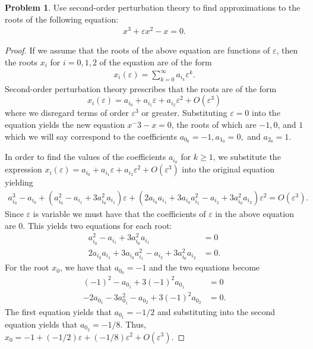 \documentclass[12pt]{article}
\theoremstyle{definition}
\newtheorem{problem}{Problem}
\begin{document}
\begin{problem}
  Use second-order perturbation theory to find approximations to the roots of the following equation:
  \begin{align*}
    x^3 + \varepsilon x^2 - x = 0.
  \end{align*}
\end{problem}

\begin{proof}
  If we assume that the roots of the above equation are functions of $\varepsilon$,
  then the roots $x_i$ for $i=0,1,2$ of the equation are of the form
  \begin{align*}
    x_i(\varepsilon) = \sum_{k=0}^\infty a_{i_k} \varepsilon ^k.
  \end{align*}
  Second-order perturbation theory prescribes that the roots are of the form
  $$x_i(\varepsilon) = a_{i_0} + a_{i_1} \varepsilon + a_{i_2} \varepsilon^2 + O(\varepsilon^3)$$
  where we disregard terms of order $\varepsilon^3$ or greater. Substituting $\varepsilon = 0$
  into the equation yields the new equation $x^-3 -x = 0$, the roots of which are $-1, 0$, and $1$
  which we will say correspond to the coefficients $a_{0_0} = -1, a_{1_0} = 0, $ and $a_{2_0} = 1$.

  In order to find the values of the coefficients $a_{i_k}$ for $k \geq 1$, we substitute the expression
  $x_i(\varepsilon) = a_{i_0} + a_{i_1} \varepsilon + a_{i_2} \varepsilon^2 + O(\varepsilon^3)$ into the original equation
  yielding
  \begin{align*}
    a_{i_0}^3-a_{i_0} + (a_{i_0}^2  -a_{i_1} + 3a_{i_0}^2a_{i_1})\varepsilon + (2a_{i_0}a_{i_1} + 3a_{i_0}a_{i_1}^2 - a_{i_2} + 3a_{i_0}^2a_{i_2})\varepsilon^2 = O(\varepsilon^3).
  \end{align*}
  Since $\varepsilon$ is variable we must have that the coefficients of $\varepsilon$ in the above equation are 0.
  This yields two equations for each root:
  \begin{align*}
    a_{i_0}^2  -a_{i_1} + 3a_{i_0}^2a_{i_1} &= 0 \\
    2a_{i_0}a_{i_1} + 3a_{i_0}a_{i_1}^2 - a_{i_2} + 3a_{i_0}^2a_{i_2} &= 0.
  \end{align*}
  For the root $x_0$, we have that $a_{0_0} = -1$ and the two equations become
  \begin{align*}
    (-1)^2  -a_{0_1} + 3(-1)^2a_{0_1} &= 0 \\
    -2a_{0_1} - 3a_{0_1}^2 - a_{0_2} + 3(-1)^2a_{0_2} &= 0.
  \end{align*}
  The first equation yields that $a_{0_1} = -1/2$ and substituting into the second
  equation yields that $a_{0_2} = -1/8$. Thus, $x_0 = -1 + (-1/2)\varepsilon + (-1/8)\varepsilon^2 + O(\varepsilon^3)$.


\end{proof}
\end{document}
